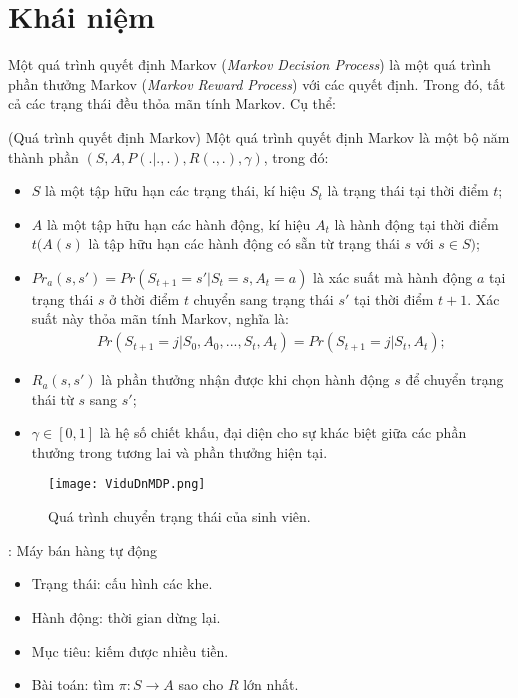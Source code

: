 \section{Khái niệm}
Một quá trình quyết định Markov (\textit{Markov Decision Process}) là một quá trình phần thưởng Markov (\textit{Markov Reward Process}) với các quyết định. Trong đó, tất cả các trạng thái đều thỏa mãn tính Markov. Cụ thể:
\begin{dn}\rm
(Quá trình quyết định Markov) Một quá trình quyết định Markov là một bộ năm thành phần $(S,A,P(.|.,.),R(.,.),\gamma)$, trong đó:
\begin{itemize}
 \item $S$ là một tập hữu hạn các trạng thái, kí hiệu $S_t$ là trạng thái tại thời điểm $t$; 
 \item $A$ là một tập hữu hạn các hành động, kí hiệu $A_t$ là hành động tại thời điểm $t (A(s)$ là tập hữu hạn các hành động có sẵn từ trạng thái $s$ với $s\in S)$;
 \item $Pr_{a}(s,s')=Pr(S_{t+1}=s'|S_t=s,A_t=a)$ là xác suất mà hành động $a$ tại trạng thái $s$ ở thời điểm $t$ chuyển sang trạng thái $s'$ tại thời điểm $t+1$. Xác suất này thỏa mãn tính Markov, nghĩa là:
 \begin{align*}
 Pr(S_{t+1}=j|S_0,A_0,...,S_t,A_t)=Pr(S_{t+1}=j|S_t,A_t);
 \end{align*}
 \item $R_a(s,s')$ là phần thưởng nhận được khi chọn hành động $s$ để chuyển trạng thái từ $s$ sang $s'$;
 \item $\gamma \in [0,1]$ là hệ số chiết khấu, đại diện cho sự khác biệt giữa các phần thưởng trong tương lai và phần thưởng hiện tại.
\end{itemize}
\begin{figure}[ht]
    \centering
    \begin{center}
    \texttt{[image: ViduDnMDP.png]}
    \end{center}    
    \caption{Quá trình chuyển trạng thái của sinh viên.}
    \label{fig:ViduDnMDP}
\end{figure}
\end{dn}
\begin{vd} \rm: Máy bán hàng tự động
\begin{itemize}
\item Trạng thái: cấu hình các khe.
\item Hành động: thời gian dừng lại.
\item Mục tiêu: kiếm được nhiều tiền.
\item Bài toán: tìm $\pi:S\to A$ sao cho $R$ lớn nhất.
\end{itemize}
\end{vd}
